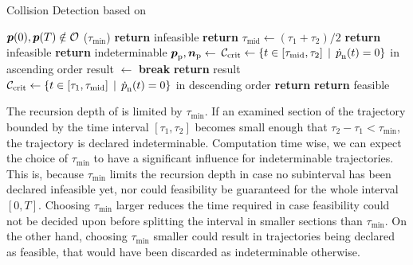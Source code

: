 \begin{algorithm}
    \caption{Collision Detection based on \cite{Bucki19}}
    \label{alg:collision-detection}
	\begin{algorithmic}[1]
		\Require $\mbox{$\bm{p}$}(0),\mbox{$\bm{p}$}(T) \notin \mathcal{O}$
		($\tau_{\min}$)
				\State \textbf{return} infeasible
			\EndIf
			\State \textbf{return}
		\EndFunction
		\State $\tau_{\text{mid}} \gets (\tau_1 + \tau_2) / 2$
			\State \textbf{return} infeasible
			\State \textbf{return} indeterminable
		\EndIf
		\State $\mbox{$\bm{p}$}_{\text{p}}, \mbox{$\bm{n}$}_{\text{p}} \gets$
		\State $\mathcal{C}_{\text{crit}} \gets
		\left\{
			t \in \left[ \tau_{\text{mid}}, \tau_2 \right]
			\,\mid\, \mbox{$\dot{p}$}_{\text{n}}(t) = 0
		\right\}$ in ascending order
				\State result $\gets$ 
					\State \textbf{break}
				\Else
					\State \textbf{return} result
				\EndIf
			\EndIf
		\EndFor
		\State $\mathcal{C}_{\text{crit}} \gets
		\left\{
			t \in \left[ \tau_1, \tau_{\text{mid}}\right]
			\,\mid\, \mbox{$\dot{p}$}_{\text{n}}(t) = 0
		\right\}$ in descending order
				\State \textbf{return} 
			\EndIf
		\EndFor
		\State \textbf{return} feasible
		\EndFunction
	\end{algorithmic}
\end{algorithm}

The recursion depth of  is limited by $\tau_{\min}$.
If an examined section of the trajectory bounded by the time interval $\left[\tau_1, \tau_2\right]$ becomes small enough that $\tau_2 - \tau_1 < \tau_{\min}$, the trajectory is declared indeterminable.
Computation time wise, we can expect the choice of $\tau_{\min}$ to have a significant influence for indeterminable trajectories.
This is, because $\tau_{\min}$ limits the recursion depth in case no subinterval has been declared infeasible yet, nor could feasibility be guaranteed for the whole interval $\left[0, T\right]$.
Choosing $\tau_{\min}$ larger reduces the time required in case feasibility could not be decided upon before splitting the interval in smaller sections than $\tau_{\min}$.
On the other hand, choosing $\tau_{\min}$ smaller could result in trajectories being declared as feasible, that would have been discarded as indeterminable otherwise.

